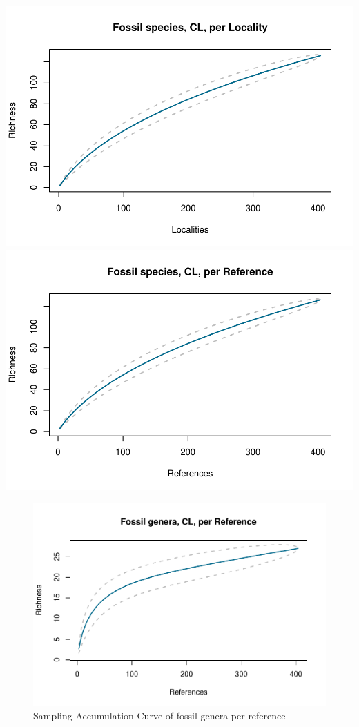 \documentclass[]{article}
\begin{document}
\includegraphics{MA_JJ_files/figure-latex/Species Accumulation Curve-1.pdf}
\includegraphics{MA_JJ_files/figure-latex/Species Accumulation Curve-2.pdf}

\begin{figure}[htbp]
\centering
\includegraphics{MA_JJ_files/figure-latex/Species Accumulation Curve with Genera-1.pdf}
\caption{Sampling Accumulation Curve of fossil genera per reference}
\end{figure}
\end{document}
